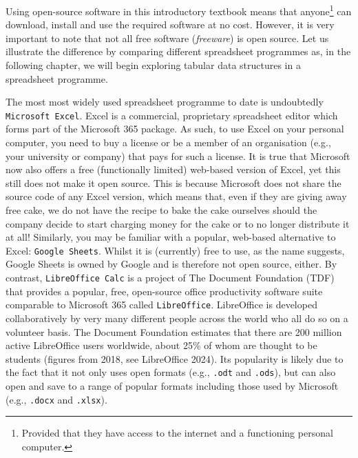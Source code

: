 \documentclass[
  letterpaper,
  DIV=11,
  numbers=noendperiod]{scrreprt}
\begin{document}
Using open-source software in this introductory textbook means that
anyone\footnote{Provided that they have access to the internet and a
  functioning personal computer.} can download, install and use the
required software at no cost. However, it is very important to note that
not all free software (\emph{freeware}) is open source. Let us
illustrate the difference by comparing different spreadsheet programmes
as, in the following chapter, we will begin exploring tabular data
structures in a spreadsheet programme.

The most most widely used spreadsheet programme to date is undoubtedly
\texttt{Microsoft\ Excel}. Excel is a commercial, proprietary
spreadsheet editor which forms part of the Microsoft 365 package. As
such, to use Excel on your personal computer, you need to buy a license
or be a member of an organisation (e.g., your university or company)
that pays for such a license. It is true that Microsoft now also offers
a free (functionally limited) web-based version of Excel, yet this still
does not make it open source. This is because Microsoft does not share
the source code of any Excel version, which means that, even if they are
giving away free cake, we do not have the recipe to bake the cake
ourselves should the company decide to start charging money for the cake
or to no longer distribute it at all! Similarly, you may be familiar
with a popular, web-based alternative to Excel: \texttt{Google\ Sheets}.
Whilst it is (currently) free to use, as the name suggests, Google
Sheets is owned by Google and is therefore not open source, either. By
contrast, \texttt{LibreOffice\ Calc} is a project of The Document
Foundation (TDF) that provides a popular, free, open-source office
productivity software suite comparable to Microsoft 365 called
\texttt{LibreOffice}. LibreOffice is developed collaboratively by very
many different people across the world who all do so on a volunteer
basis. The Document Foundation estimates that there are 200 million
active LibreOffice users worldwide, about 25\% of whom are thought to be
students (figures from 2018, see LibreOffice 2024). Its popularity is
likely due to the fact that it not only uses open formats (e.g.,
\texttt{.odt} and \texttt{.ods}), but can also open and save to a range
of popular formats including those used by Microsoft (e.g.,
\texttt{.docx} and \texttt{.xlsx}).
\end{document}
